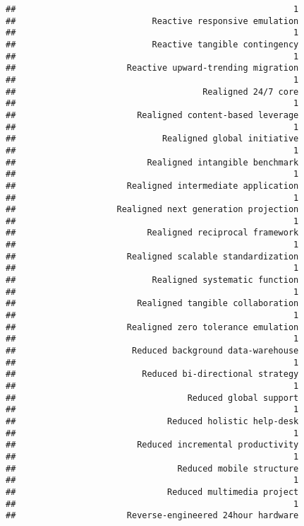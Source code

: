 \documentclass[
]{article}
\begin{document}
\begin{verbatim}
##                                                       1 
##                           Reactive responsive emulation 
##                                                       1 
##                           Reactive tangible contingency 
##                                                       1 
##                      Reactive upward-trending migration 
##                                                       1 
##                                     Realigned 24/7 core 
##                                                       1 
##                        Realigned content-based leverage 
##                                                       1 
##                             Realigned global initiative 
##                                                       1 
##                          Realigned intangible benchmark 
##                                                       1 
##                      Realigned intermediate application 
##                                                       1 
##                    Realigned next generation projection 
##                                                       1 
##                          Realigned reciprocal framework 
##                                                       1 
##                      Realigned scalable standardization 
##                                                       1 
##                           Realigned systematic function 
##                                                       1 
##                        Realigned tangible collaboration 
##                                                       1 
##                      Realigned zero tolerance emulation 
##                                                       1 
##                       Reduced background data-warehouse 
##                                                       1 
##                         Reduced bi-directional strategy 
##                                                       1 
##                                  Reduced global support 
##                                                       1 
##                              Reduced holistic help-desk 
##                                                       1 
##                        Reduced incremental productivity 
##                                                       1 
##                                Reduced mobile structure 
##                                                       1 
##                              Reduced multimedia project 
##                                                       1 
##                      Reverse-engineered 24hour hardware 

\end{verbatim}
\end{document}
